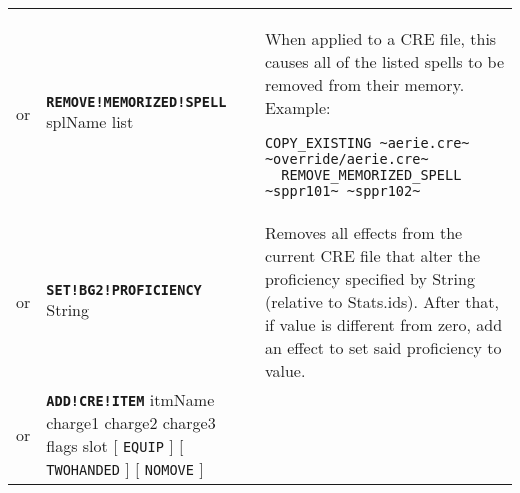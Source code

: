 \documentclass{article}
\def\ttref#1{\ahrefloc{#1}{\tt #1}}
\def\DEFINE#1{{\tt \bf #1}\label{#1}\index{#1}}
\def\t#1{{\tt #1}}
\def\Slist{{\color{red} list }}
\def\Ob{{\color{red} [ }}
\def\Oe{{\color{red} ] }}
\begin{document}
\begin{tabular}{cp{10in}|p{10in}}
or & \DEFINE{REMOVE!MEMORIZED!SPELL} splName \Slist &
  When applied to a CRE file, this \ttref{patch} causes all of the
  listed spells to be removed from their memory. Example:
\begin{verbatim}
COPY_EXISTING ~aerie.cre~ ~override/aerie.cre~
  REMOVE_MEMORIZED_SPELL ~sppr101~ ~sppr102~
\end{verbatim}
 \\

or & \DEFINE{SET!BG2!PROFICIENCY} String \ttref{value} &
	Removes all effects from the current CRE file that alter the proficiency specified by
	String (relative to Stats.ids). After that, if value is different from zero, add an effect
	to set said proficiency to value. \\

or & \DEFINE{ADD!CRE!ITEM} itmName charge1 charge2 charge3 flags slot \Ob
\t{EQUIP} \Oe \Ob \t{TWOHANDED} \Oe \Ob \t{NOMOVE} \Oe &


\end{tabular}
\end{document}
